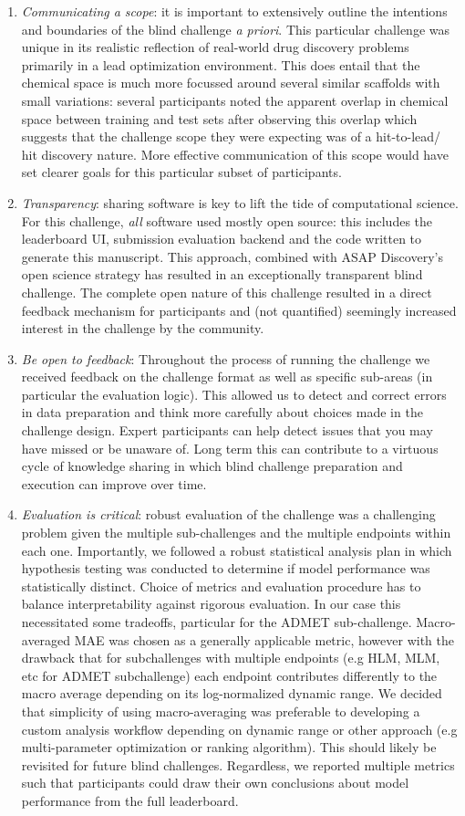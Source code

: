 \documentclass[journal=jcim,manuscript=article]{achemso}
\begin{document}
\begin{enumerate}
    \item \textit{Communicating a scope}: it is important to extensively outline the intentions and boundaries of the blind challenge \textit{a priori}. This particular challenge was unique in its realistic reflection of real-world drug discovery problems primarily in a lead optimization environment. This does entail that the chemical space is much more focussed around several similar scaffolds with small variations: several participants noted the apparent overlap in chemical space between training and test sets after observing this overlap which suggests that the challenge scope they were expecting was of a hit-to-lead/ hit discovery nature. More effective communication of this scope would have set clearer goals for this particular subset of participants.
    \item \textit{Transparency}: sharing software is key to lift the tide of computational science. For this challenge, \textit{all} software used mostly open source: this includes the leaderboard UI, submission evaluation backend and the code written to generate this manuscript. This approach, combined with ASAP Discovery's open science strategy has resulted in an exceptionally transparent blind challenge. The complete open nature of this challenge resulted in a direct feedback mechanism for participants and (not quantified) seemingly increased interest in the challenge by the community.
    \item \textit{Be open to feedback}: Throughout the process of running the challenge we received feedback on the challenge format as well as specific sub-areas (in particular the evaluation logic). This allowed us to detect and correct errors in data preparation and think more carefully about choices made in the challenge design. Expert participants can help detect issues that you may have missed or be unaware of. Long term this can contribute to a virtuous cycle of knowledge sharing in which blind challenge preparation and execution can improve over time. 
    \item \textit{Evaluation is critical}: robust evaluation of the challenge was a challenging problem given the multiple sub-challenges and the multiple endpoints within each one. Importantly, we followed a robust statistical analysis plan in which hypothesis testing was conducted to determine if model performance was statistically distinct\cite{ash_practically_2024}.  Choice of metrics and evaluation procedure has to balance interpretability against rigorous evaluation. In our case this necessitated some tradeoffs, particular for the ADMET sub-challenge. Macro-averaged MAE was chosen as a generally applicable metric, however with the drawback that for subchallenges with multiple endpoints (e.g HLM, MLM, etc for ADMET subchallenge) each endpoint contributes differently to the macro average depending on its log-normalized dynamic range.  We decided that simplicity of using macro-averaging was preferable to developing a custom analysis workflow depending on dynamic range or other approach (e.g multi-parameter optimization or ranking algorithm). This should likely be revisited for future blind challenges. Regardless, we reported multiple metrics such that participants could draw their own conclusions about model performance from the full leaderboard.

\end{enumerate}
\end{document}

